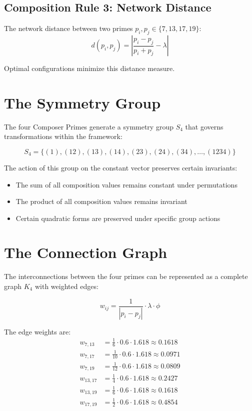 \documentclass[12pt,a4paper]{report}
\newcommand{\genprimes}{\{7, 13, 17, 19\}}
\begin{document}
\subsection{Composition Rule 3: Network Distance}

The network distance between two primes $p_i, p_j \in \genprimes$:
\[
d(p_i, p_j) = \left| \frac{p_i - p_j}{p_i + p_j} - \lambda \right|
\]

Optimal configurations minimize this distance measure.

\section{The Symmetry Group}

The four Composer Primes generate a symmetry group $S_4$ that governs transformations within the framework:

\[
S_4 = \{(1), (12), (13), (14), (23), (24), (34), \ldots, (1234)\}
\]

The action of this group on the constant vector preserves certain invariants:

\begin{itemize}
\item The sum of all composition values remains constant under permutations
\item The product of all composition values remains invariant
\item Certain quadratic forms are preserved under specific group actions
\end{itemize}

\section{The Connection Graph}

The interconnections between the four primes can be represented as a complete graph $K_4$ with weighted edges:

\[
w_{ij} = \frac{1}{|p_i - p_j|} \cdot \lambda \cdot \phi
\]

The edge weights are:
\begin{align*}
w_{7,13} &= \frac{1}{6} \cdot 0.6 \cdot 1.618 \approx 0.1618 \\
w_{7,17} &= \frac{1}{10} \cdot 0.6 \cdot 1.618 \approx 0.0971 \\
w_{7,19} &= \frac{1}{12} \cdot 0.6 \cdot 1.618 \approx 0.0809 \\
w_{13,17} &= \frac{1}{4} \cdot 0.6 \cdot 1.618 \approx 0.2427 \\
w_{13,19} &= \frac{1}{6} \cdot 0.6 \cdot 1.618 \approx 0.1618 \\
w_{17,19} &= \frac{1}{2} \cdot 0.6 \cdot 1.618 \approx 0.4854
\end{align*}
\end{document}
